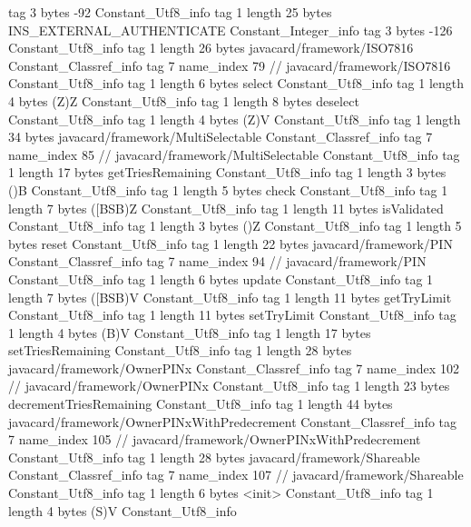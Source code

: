 {{{			tag	3
			bytes	-92
		}
		Constant_Utf8_info {
			tag	1
			length	25
			bytes	INS_EXTERNAL_AUTHENTICATE
		}
		Constant_Integer_info {
			tag	3
			bytes	-126
		}
		Constant_Utf8_info {
			tag	1
			length	26
			bytes	javacard/framework/ISO7816
		}
		Constant_Classref_info {
			tag	7
			name_index	79		// javacard/framework/ISO7816
		}
		Constant_Utf8_info {
			tag	1
			length	6
			bytes	select
		}
		Constant_Utf8_info {
			tag	1
			length	4
			bytes	(Z)Z
		}
		Constant_Utf8_info {
			tag	1
			length	8
			bytes	deselect
		}
		Constant_Utf8_info {
			tag	1
			length	4
			bytes	(Z)V
		}
		Constant_Utf8_info {
			tag	1
			length	34
			bytes	javacard/framework/MultiSelectable
		}
		Constant_Classref_info {
			tag	7
			name_index	85		// javacard/framework/MultiSelectable
		}
		Constant_Utf8_info {
			tag	1
			length	17
			bytes	getTriesRemaining
		}
		Constant_Utf8_info {
			tag	1
			length	3
			bytes	()B
		}
		Constant_Utf8_info {
			tag	1
			length	5
			bytes	check
		}
		Constant_Utf8_info {
			tag	1
			length	7
			bytes	([BSB)Z
		}
		Constant_Utf8_info {
			tag	1
			length	11
			bytes	isValidated
		}
		Constant_Utf8_info {
			tag	1
			length	3
			bytes	()Z
		}
		Constant_Utf8_info {
			tag	1
			length	5
			bytes	reset
		}
		Constant_Utf8_info {
			tag	1
			length	22
			bytes	javacard/framework/PIN
		}
		Constant_Classref_info {
			tag	7
			name_index	94		// javacard/framework/PIN
		}
		Constant_Utf8_info {
			tag	1
			length	6
			bytes	update
		}
		Constant_Utf8_info {
			tag	1
			length	7
			bytes	([BSB)V
		}
		Constant_Utf8_info {
			tag	1
			length	11
			bytes	getTryLimit
		}
		Constant_Utf8_info {
			tag	1
			length	11
			bytes	setTryLimit
		}
		Constant_Utf8_info {
			tag	1
			length	4
			bytes	(B)V
		}
		Constant_Utf8_info {
			tag	1
			length	17
			bytes	setTriesRemaining
		}
		Constant_Utf8_info {
			tag	1
			length	28
			bytes	javacard/framework/OwnerPINx
		}
		Constant_Classref_info {
			tag	7
			name_index	102		// javacard/framework/OwnerPINx
		}
		Constant_Utf8_info {
			tag	1
			length	23
			bytes	decrementTriesRemaining
		}
		Constant_Utf8_info {
			tag	1
			length	44
			bytes	javacard/framework/OwnerPINxWithPredecrement
		}
		Constant_Classref_info {
			tag	7
			name_index	105		// javacard/framework/OwnerPINxWithPredecrement
		}
		Constant_Utf8_info {
			tag	1
			length	28
			bytes	javacard/framework/Shareable
		}
		Constant_Classref_info {
			tag	7
			name_index	107		// javacard/framework/Shareable
		}
		Constant_Utf8_info {
			tag	1
			length	6
			bytes	<init>
		}
		Constant_Utf8_info {
			tag	1
			length	4
			bytes	(S)V
		}
		Constant_Utf8_info {
}}}
